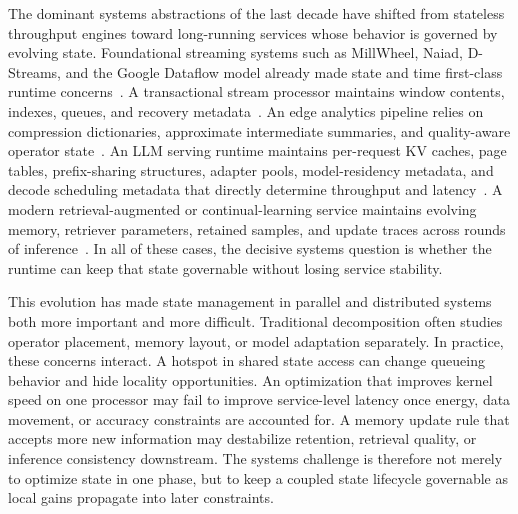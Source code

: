 \documentclass[acmsmall,screen,review]{acmart}
\newcommand{\sysproblem}{state management in parallel and distributed systems\xspace}
\begin{document}
The dominant systems abstractions of the last decade have shifted from stateless throughput engines toward long-running services whose behavior is governed by evolving state. Foundational streaming systems such as MillWheel, Naiad, D-Streams, and the Google Dataflow model already made state and time first-class runtime concerns~\cite{akidau2013millwheel,murray2013naiad,zaharia2013dstreams,akidau2015dataflow}. A transactional stream processor maintains window contents, indexes, queues, and recovery metadata~\cite{zhang2017revisiting,zhang2019briskstream,mao2023morphstream}. An edge analytics pipeline relies on compression dictionaries, approximate intermediate summaries, and quality-aware operator state~\cite{zeng2024cstream,zeng2024pecj}. An LLM serving runtime maintains per-request KV caches, page tables, prefix-sharing structures, adapter pools, model-residency metadata, and decode scheduling metadata that directly determine throughput and latency~\cite{kwon2023pagedattention,agrawal2024sarathi,sheng2023slora,yu2025prism,zheng2023sglang,zhang2025jenga}. A modern retrieval-augmented or continual-learning service maintains evolving memory, retriever parameters, retained samples, and update traces across rounds of inference~\cite{wu2023sentistream,zhou2025ferret,li2025global,zhang2026flowrag}. In all of these cases, the decisive systems question is whether the runtime can keep that state governable without losing service stability.

This evolution has made \sysproblem both more important and more difficult. Traditional decomposition often studies operator placement, memory layout, or model adaptation separately. In practice, these concerns interact. A hotspot in shared state access can change queueing behavior and hide locality opportunities. An optimization that improves kernel speed on one processor may fail to improve service-level latency once energy, data movement, or accuracy constraints are accounted for. A memory update rule that accepts more new information may destabilize retention, retrieval quality, or inference consistency downstream. The systems challenge is therefore not merely to optimize state in one phase, but to keep a coupled state lifecycle governable as local gains propagate into later constraints.
\end{document}
